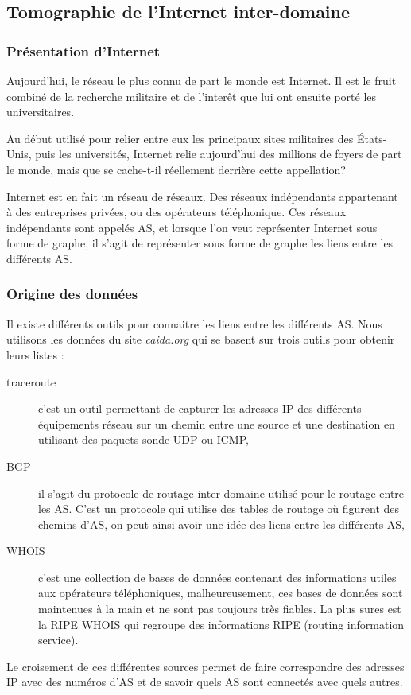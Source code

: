 
% 

\subsection{Tomographie de l'Internet inter-domaine}

\subsubsection{Pr\'esentation d'Internet}
\par
Aujourd'hui, le r\'eseau le plus connu de part le monde est Internet. Il est le fruit combin\'e de la recherche militaire et de l'inter\^et que lui ont ensuite port\'e les universitaires.
\par
Au d\'ebut utilis\'e pour relier entre eux les principaux sites militaires des \'Etats-Unis, puis les universit\'es, Internet relie aujourd'hui des millions de foyers de part le monde, mais que se cache-t-il r\'eellement derri\`ere cette appellation?
\par
Internet est en fait un r\'eseau de r\'eseaux. Des r\'eseaux ind\'ependants appartenant \`a des entreprises priv\'ees, ou des op\'erateurs t\'el\'ephonique. Ces r\'eseaux ind\'ependants sont appel\'es AS, et lorsque l'on veut repr\'esenter Internet sous forme de graphe, il s'agit de repr\'esenter sous forme de graphe les liens entre les diff\'erents AS.

\subsubsection{Origine des donn\'ees}
\par
Il existe diff\'erents outils pour connaitre les liens entre les diff\'erents AS. Nous utilisons les donn\'ees du site \textit{caida.org} qui se basent sur trois outils pour obtenir leurs listes :
\begin{description}
 \item[traceroute] c'est un outil permettant de capturer les adresses IP des diff\'erents \'equipements r\'eseau sur un chemin entre une source et une destination en utilisant des paquets sonde UDP ou ICMP,
 \item[BGP] il s'agit du protocole de routage inter-domaine utilis\'e pour le routage entre les AS. C'est un protocole qui utilise des tables de routage o\`u figurent des chemins d'AS, on peut ainsi avoir une idée des liens entre les diff\'erents AS,
 \item[WHOIS] c'est une collection de bases de donn\'ees contenant des informations utiles aux op\'erateurs t\'el\'ephoniques, malheureusement, ces bases de donn\'ees sont maintenues \`a la main et ne sont pas toujours tr\`es fiables. La plus sures est la RIPE WHOIS qui regroupe des informations RIPE (routing information service).
\end{description}
\par
Le croisement de ces diff\'erentes sources permet de faire correspondre des adresses IP avec des num\'eros d'AS et de savoir quels AS sont connect\'es avec quels autres.

